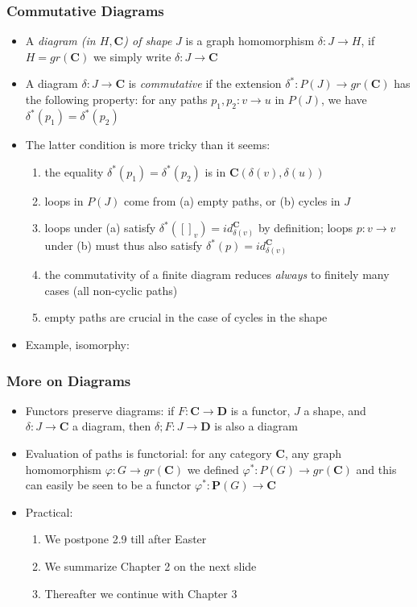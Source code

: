 \documentclass[handout]{beamer}
\newcommand{\bfsf}[1]{{\boldsymbol{#1}}}
\newcommand{\CC}{\bfsf{C}}
\newcommand{\DD}{\bfsf{D}}
\newcommand{\PP}{\bfsf{P}}
\begin{document}
\frame
  {   
    \frametitle{Commutative Diagrams}\label{Ch2:CommDiags}

 \begin{itemize}[<+->]
\item A \emph{diagram (in $H,\CC$) of shape} $J$ is a graph homomorphism
$\delta : J\to H$, if $H = gr(\CC)$ we simply write $\delta : J\to \CC$

\item A diagram $\delta : J\to \CC$ is \emph{commutative} if the
extension $\delta^* : P(J) \to gr(\CC)$ has the following property:
for any paths $p_1,p_2 : v\to u$ in $P(J)$, we have $\delta^*(p_1)=\delta^*(p_2)$
\item The latter condition is more tricky than it seems:
   \begin{enumerate}[<+->]
\item the equality $\delta^*(p_1)=\delta^*(p_2)$ is in $\CC(\delta(v),\delta(u))$
\item loops in $P(J)$ come from (a) empty paths, or (b) cycles in $J$
\item loops under (a) satisfy $\delta^*([]_v) = id^\CC_{\delta(v)}$ by definition;
loops $p: v\to v$ under (b) must thus also satisfy $\delta^*(p) = id^\CC_{\delta(v)}$
\item the commutativity of a finite diagram reduces \emph{always}
to finitely many cases (all non-cyclic paths)
\item empty paths are crucial in the case of cycles in the shape
   \end{enumerate}
\item Example, isomorphy:

 \end{itemize}

}

\frame
  {   
    \frametitle{More on Diagrams}\label{Ch2:MoreOnDiags}

 \begin{itemize}[<+->]
\item Functors preserve diagrams: if $F:\CC\to\DD$ is a functor, $J$ a shape,
and $\delta : J\to \CC$ a diagram, then $\delta;F : J\to \DD$ is also a diagram
\item Evaluation of paths is functorial:
for any category $\CC$, any graph homomorphism $\varphi: G\to gr(\CC)$
we defined $\varphi^*: P(G)\to gr(\CC)$ and this can easily be seen
to be a functor $\varphi^*: \PP(G)\to \CC$
\item Practical:
   \begin{enumerate}[<+->]
\item We postpone 2.9 till after Easter
\item We summarize Chapter 2 on the next slide
\item Thereafter we continue with Chapter 3
   \end{enumerate}
 \end{itemize}

}
\end{document}
